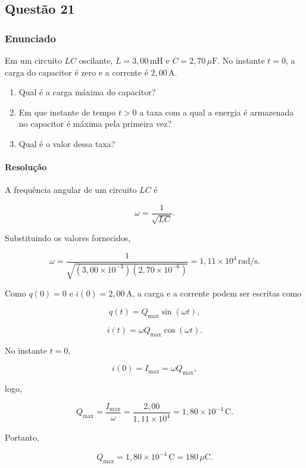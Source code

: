 \subsection{Questão 21}

\subsubsection{Enunciado}

Em um circuito \(LC\) oscilante, \(L = 3{,}00\,\mathrm{mH}\) e
\(C = 2{,}70\,\mu\mathrm{F}\). No instante \(t = 0\), a carga do capacitor é zero e a corrente é \(2{,}00\,\mathrm{A}\).

\begin{enumerate}
    \item[(a)] Qual é a carga máxima do capacitor?

    \item[(b)] Em que instante de tempo \(t > 0\) a taxa com a qual a energia é armazenada no capacitor é máxima pela primeira vez?

    \item[(c)] Qual é o valor dessa taxa?
\end{enumerate}

\paragraph{Resolução}

A frequência angular de um circuito \(LC\) é

\[
\omega=\frac{1}{\sqrt{LC}}.
\]

Substituindo os valores fornecidos,

\[
\omega
=
\frac{1}
{\sqrt{(3,00\times10^{-3})(2,70\times10^{-6})}}
=
1,11\times10^{4}\,\mathrm{rad/s}.
\]

Como \(q(0)=0\) e \(i(0)=2,00\,\mathrm{A}\), a carga e a corrente podem ser escritas como

\[
q(t)=Q_{\max}\sin(\omega t),
\]

\[
i(t)=\omega Q_{\max}\cos(\omega t).
\]

No instante \(t=0\),

\[
i(0)=I_{\max}=\omega Q_{\max},
\]

logo,

\[
Q_{\max}
=
\frac{I_{\max}}{\omega}
=
\frac{2,00}{1,11\times10^{4}}
=
1,80\times10^{-4}\,\mathrm{C}.
\]

Portanto,

\[
\boxed{Q_{\max}=1,80\times10^{-4}\,\mathrm{C}
=180\,\mu\mathrm{C}}.
\]

